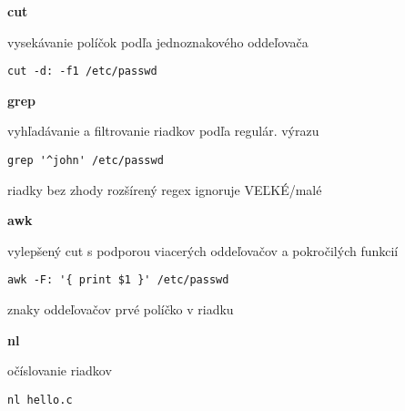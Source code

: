 \documentclass[8pt,landscape]{extarticle}
\newcommand{\Heading}[1]{%
{\begin{center}\bfseries\Large#1\end{center}}%
}%
\newcommand{\Em}[1]{\Ovalbox{\ttfamily #1}}
\newenvironment{karticka}[1]%
{%
\Heading{#1}%
}%
{%
\clearpage
}%
\begin{document}
\begin{karticka}{cut}
\begin{obsah}
vysekávanie políčok podľa jednoznakového oddeľovača
\end{obsah}
\begin{middlecolorbox}
\begin{Verbatim}
cut -d: -f1 /etc/passwd
\end{Verbatim}
\end{middlecolorbox}
\end{karticka}
\begin{karticka}{grep}
\begin{obsah}
vyhľadávanie a filtrovanie riadkov podľa regulár. výrazu
\end{obsah}
\begin{middlecolorbox}
\begin{Verbatim}
grep '^john' /etc/passwd
\end{Verbatim}
\end{middlecolorbox}

\begin{obsah}
\Em{-v} riadky bez zhody     \Em{-E} rozšírený regex
\Em{-i} ignoruje VEĽKÉ/malé  
\end{obsah}
\end{karticka}
\begin{karticka}{awk}
\begin{obsah}
vylepšený cut s podporou viacerých oddeľovačov a 
pokročilých funkcií
\end{obsah}
\begin{middlecolorbox}
\begin{Verbatim}
awk -F: '{ print $1 }' /etc/passwd 
\end{Verbatim}
\end{middlecolorbox}
\begin{obsah}
\Em{-F} znaky oddeľovačov    
\Em{$1} prvé políčko v riadku
\end{obsah}

\end{karticka}
\begin{karticka}{nl}
\begin{obsah}
očíslovanie riadkov
\end{obsah}
\begin{middlecolorbox}
\begin{Verbatim}
nl hello.c
\end{Verbatim}
\end{middlecolorbox}
\end{karticka}
\end{document}
